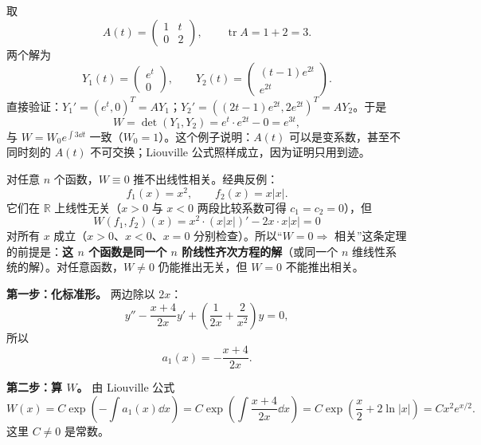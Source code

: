 \documentclass[11pt]{ctexart}
\let\orighdr\hdr
\renewcommand{\hdr}[2]{\needspace{12\baselineskip}\orighdr{#1}{#2}}
\let\origsubhdr\subhdr
\renewcommand{\subhdr}[1]{\needspace{3\baselineskip}\origsubhdr{#1}}
\newcommand{\tr}{\operatorname{tr}}
\begin{document}

取
\[
A(t)=\begin{pmatrix}1&t\\0&2\end{pmatrix},\qquad \tr A=1+2=3.
\]
两个解为
\[
Y_1(t)=\begin{pmatrix}e^t\\0\end{pmatrix},\qquad
Y_2(t)=\begin{pmatrix}(t-1)e^{2t}\\e^{2t}\end{pmatrix}.
\]
直接验证：$Y_1'=(e^t,0)^T=A Y_1$；$Y_2'=((2t-1)e^{2t},2e^{2t})^T=A Y_2$。于是
\[
W=\det(Y_1,Y_2)=e^t\cdot e^{2t}-0=e^{3t},
\]
与 $W=W_0e^{\int 3\dd t}$ 一致（$W_0=1$）。这个例子说明：$A(t)$ 可以是变系数，甚至不同时刻的 $A(t)$ 不可交换；Liouville 公式照样成立，因为证明只用到迹。


对任意 $n$ 个函数，$W\equiv0$ 推不出线性相关。经典反例：
\[
f_1(x)=x^2,\qquad f_2(x)=x|x|.
\]
它们在 $\mathbb R$ 上线性无关（$x>0$ 与 $x<0$ 两段比较系数可得 $c_1=c_2=0$），但
\[
W(f_1,f_2)(x)=x^2\cdot(x|x|)'-2x\cdot x|x|=0
\]
对所有 $x$ 成立（$x>0$、$x<0$、$x=0$ 分别检查）。所以“$W=0\Rightarrow$ 相关”这条定理的前提是：\textbf{这 $n$ 个函数是同一个 $n$ 阶线性齐次方程的解}（或同一个 $n$ 维线性系统的解）。对任意函数，$W\neq0$ 仍能推出无关，但 $W=0$ 不能推出相关。





\textbf{第一步：化标准形。} 两边除以 $2x$：
\[
y''-\frac{x+4}{2x}y'+\left(\frac{1}{2x}+\frac{2}{x^2}\right)y=0,
\]
所以
\[
a_1(x)=-\frac{x+4}{2x}.
\]

\textbf{第二步：算 $W$。} 由 Liouville 公式
\[
W(x)=C\exp\!\left(-\int a_1(x)\dd x\right)
=C\exp\!\left(\int\frac{x+4}{2x}\dd x\right)
=C\exp\!\left(\frac{x}{2}+2\ln|x|\right)
=Cx^2e^{x/2}.
\]
这里 $C\neq0$ 是常数。
\end{document}
